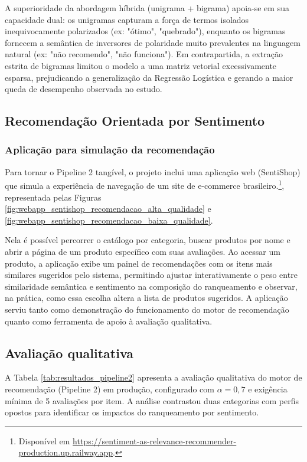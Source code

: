\documentclass{IEEEtran}
\begin{document}
A superioridade da abordagem híbrida (unigrama + bigrama) apoia-se em sua capacidade dual: os unigramas capturam a força de termos isolados inequivocamente polarizados (ex: "ótimo", "quebrado"), enquanto os bigramas fornecem a semântica de inversores de polaridade muito prevalentes na linguagem natural (ex: "não recomendo", "não funciona"). Em contrapartida, a extração estrita de bigramas limitou o modelo a uma matriz vetorial excessivamente esparsa, prejudicando a generalização da Regressão Logística e gerando a maior queda de desempenho observada no estudo.


\subsection{Recomendação Orientada por Sentimento}

\subsubsection{Aplicação para simulação da recomendação}

Para tornar o Pipeline 2 tangível, o projeto inclui uma aplicação web (SentiShop)
que simula a experiência de navegação de um site de e-commerce brasileiro.\footnote{Disponível em \url{https://sentiment-as-relevance-recommender-production.up.railway.app}.}, representada pelas Figuras \ref{fig:webapp_sentishop_recomendacao_alta_qualidade} e \ref{fig:webapp_sentishop_recomendacao_baixa_qualidade}.

Nela é possível percorrer o catálogo por categoria, buscar produtos por nome e
abrir a página de um produto específico com suas avaliações. Ao acessar um
produto, a aplicação exibe um painel de recomendações com os itens mais
similares sugeridos pelo sistema, permitindo ajustar interativamente o peso
entre similaridade semântica e sentimento na composição do ranqueamento e
observar, na prática, como essa escolha altera a lista de produtos sugeridos. A
aplicação serviu tanto como demonstração do funcionamento do motor de
recomendação quanto como ferramenta de apoio à avaliação qualitativa.


\subsection{Avaliação qualitativa}

A Tabela \ref{tab:resultados_pipeline2} apresenta a avaliação qualitativa do motor de recomendação (Pipeline 2) em produção, configurado com $\alpha=0{,}7$ e exigência mínima de 5 avaliações por item. A análise contrastou duas categorias com perfis opostos para identificar os impactos do ranqueamento por sentimento.
\end{document}
